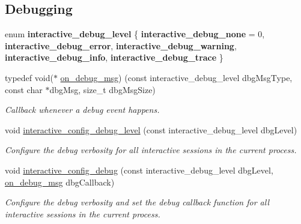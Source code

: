 \subsection*{Debugging}
\begin{DoxyCompactItemize}
\item 
\mbox{\label{group___interactivity_ga307f2211168ebb1b2ac1771a140b8ab8}} 
enum {\bfseries interactive\+\_\+debug\+\_\+level} \{ \newline
{\bfseries interactive\+\_\+debug\+\_\+none} = 0, 
{\bfseries interactive\+\_\+debug\+\_\+error}, 
{\bfseries interactive\+\_\+debug\+\_\+warning}, 
{\bfseries interactive\+\_\+debug\+\_\+info}, 
\newline
{\bfseries interactive\+\_\+debug\+\_\+trace}
 \}
\item 
typedef void($\ast$ \mbox{\hyperlink{group___interactivity_gac182f6e9e39863cd1671a69aa1ead684}{on\+\_\+debug\+\_\+msg}}) (const interactive\+\_\+debug\+\_\+level dbg\+Msg\+Type, const char $\ast$dbg\+Msg, size\+\_\+t dbg\+Msg\+Size)
\begin{DoxyCompactList}\small\item\em Callback whenever a debug event happens. \end{DoxyCompactList}\item 
void \mbox{\hyperlink{group___interactivity_gad0f225a797f196ed37fea7971314dde7}{interactive\+\_\+config\+\_\+debug\+\_\+level}} (const interactive\+\_\+debug\+\_\+level dbg\+Level)
\begin{DoxyCompactList}\small\item\em Configure the debug verbosity for all interactive sessions in the current process. \end{DoxyCompactList}\item 
void \mbox{\hyperlink{group___interactivity_gaf52c59ab6d2f401ca66aa6bd6d85ba7c}{interactive\+\_\+config\+\_\+debug}} (const interactive\+\_\+debug\+\_\+level dbg\+Level, \mbox{\hyperlink{group___interactivity_gac182f6e9e39863cd1671a69aa1ead684}{on\+\_\+debug\+\_\+msg}} dbg\+Callback)
\begin{DoxyCompactList}\small\item\em Configure the debug verbosity and set the debug callback function for all interactive sessions in the current process. \end{DoxyCompactList}\end{DoxyCompactItemize}
